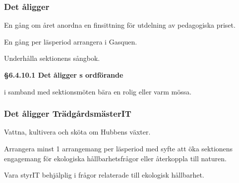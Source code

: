 \subsubsection{Det åligger \SEXIT}
\begin{att}
	\item En gång om året anordna en finsittning för utdelning av pedagogiska priset.
	\item En gång per läsperiod arrangera i Gasquen.
	\item Underhålla sektionens sångbok. 
\end{att}
\textbf{§6.4.10.1 Det åligger \SEXIT{}s ordförande}
\begin{att}
	\item  i samband med sektionsmöten bära en rolig eller varm mössa.
\end{att}

\subsubsection{Det åligger TrädgårdsmästerIT}
\begin{att}
	\item Vattna, kultivera och sköta om Hubbens växter.
	\item Arrangera minst 1 arrangemang per läsperiod med syfte att öka sektionens engagemang för ekologiska hållbarhetsfrågor eller återkoppla till naturen.
	\item Vara styrIT behjälplig i frågor relaterade till ekologisk hållbarhet.
\end{att}


\begin{comment}

\newpage

\newpage

\newpage

\newpage

\newpage

\newpage

\newpage

\newpage

\end{comment}

